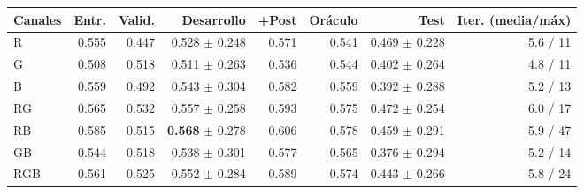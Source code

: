 \footnotesize
\begin{tabular}{lrrrrrrr}
\toprule
Canales & Entr. & Valid. & Desarrollo & +Post & Oráculo & Test & Iter. (media/máx) \\
\midrule
R & 0.555 & 0.447 & 0.528 $\pm$ 0.248 & 0.571 & 0.541 & 0.469 $\pm$ 0.228 & 5.6 / 11 \\
G & 0.508 & 0.518 & 0.511 $\pm$ 0.263 & 0.536 & 0.544 & 0.402 $\pm$ 0.264 & 4.8 / 11 \\
B & 0.559 & 0.492 & 0.543 $\pm$ 0.304 & 0.582 & 0.559 & 0.392 $\pm$ 0.288 & 5.2 / 13 \\
RG & 0.565 & 0.532 & 0.557 $\pm$ 0.258 & 0.593 & 0.575 & 0.472 $\pm$ 0.254 & 6.0 / 17 \\
RB & 0.585 & 0.515 & \textbf{0.568} $\pm$ 0.278 & 0.606 & 0.578 & 0.459 $\pm$ 0.291 & 5.9 / 47 \\
GB & 0.544 & 0.518 & 0.538 $\pm$ 0.301 & 0.577 & 0.565 & 0.376 $\pm$ 0.294 & 5.2 / 14 \\
RGB & 0.561 & 0.525 & 0.552 $\pm$ 0.284 & 0.589 & 0.574 & 0.443 $\pm$ 0.266 & 5.8 / 24 \\
\bottomrule
\end{tabular}
